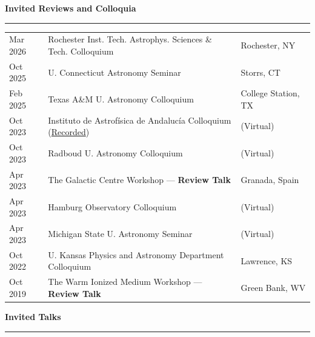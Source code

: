 \documentclass[11pt]{article}
\makeatletter
\def\vhrulefill#1{\leavevmode\leaders\hrule \@height #1\hfill \kern\z@}
\newcommand{\subsectionname}[1]{{\large\bf #1 \vhrulefill{0.5pt}}}
\makeatother
\begin{document}


\subsectionname{Invited Reviews and  Colloquia}\vspace{-6pt}

\begin{longtable}{p{} p{}p{}}

Mar 2026 & Rochester Inst. Tech. Astrophys. Sciences \& Tech. Colloquium & {\small Rochester, NY}\\

Oct 2025& U. Connecticut Astronomy Seminar & {\small Storrs, CT}\\

Feb 2025 & Texas A\&M U. Astronomy Colloquium & {\small College Station, TX}\\

Oct 2023 & Instituto de Astrof\'isica de Andaluc\'ia Colloquium {\small (\href{https://youtu.be/0gQPiKdQCm4}{Recorded})}& {\small (Virtual)}\\

Oct 2023 & Radboud U. Astronomy Colloquium & {\small (Virtual)}\\

Apr 2023 & The Galactic Centre Workshop --- {\bf Review Talk} & {\small Granada, Spain}\\

Apr 2023 & Hamburg Observatory Colloquium & {\small (Virtual)}\\

Apr 2023 & Michigan State U. Astronomy Seminar & {\small (Virtual)}\\

Oct 2022 & U. Kansas Physics and Astronomy Department Colloquium & {\small Lawrence, KS} \\

 Oct 2019 & The Warm Ionized Medium Workshop ---  {\bf Review Talk} & {\small Green Bank, WV}\\

\end{longtable}
\vspace{-12pt}


\subsectionname{Invited Talks}\vspace{-6pt}
\end{document}
